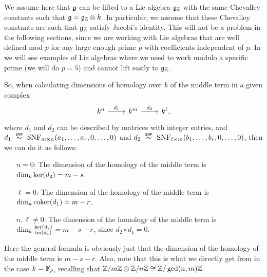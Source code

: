 \begin{remark}
  We assume here that $\mathfrak{g}$ can be lifted to a Lie algebra $\mathfrak{g}_{\mathbb{Z}}$ with the same Chevalley constants such that $\mathfrak{g} = \mathfrak{g}_{\mathbb{Z}} \otimes k$. In particular, we assume that these Chevalley constants are such that $\mathfrak{g}_{\mathbb{Z}}$ satisfy Jacobi's identity. This will not be a problem in the following sections, since we are working with Lie algebras that are well defined mod $p$ for any large enough prime $p$ with coefficients independent of $p$. In  we will see examples of Lie algebras where we need to work modulo a specific prime (we will do $p = 5$) and cannot lift easily to $\mathfrak{g}_{\mathbb{Z}}$.
\end{remark}

So, when calculating dimensions of homology over $k$ of the middle term in a given complex
\[
  \begin{tikzcd}
    k^{n} \ar[r,"d_{1}"] & k^{m} \ar[r,"d_{2}"] & k^{\ell},
  \end{tikzcd}
\]
where $d_{1}$ and $d_{2}$ can be described by matrices with integer entries, and $d_{1} \snfsim \SNF_{m \times n}(a_{1},\dotsc,a_{r},0,\dotsc,0)$ and $d_{2} \snfsim \SNF_{\ell \times m}(b_{1},\dotsc,b_{r},0,\dotsc,0)$, then we can do it as follows:
\begin{enumerate}[align=left]
  \item[$n=0$:] The dimension of the homology of the middle term is $\dim_{k} \operatorname{ker}(d_{2}) = m-s$.
  \item[$\ell=0$:] The dimension of the homology of the middle term is $\dim_{k} \operatorname{coker}(d_{1}) = m-r$.
  \item[$n,\ell \neq 0$:] The dimension of the homology of the middle term is $\dim_{k} \frac{\operatorname{ker}(d_{2})}{\operatorname{im}(d_{1})} = m-s-r$, since $d_{2} \circ d_{1} = 0$.
\end{enumerate}

\begin{remark}
  Here the general formula is obviously just that the dimension of the homology of the middle term is $m-s-r$. Also, note that this is what we directly get from  in the case $k = \mathbb{F}_{p}$, recalling that $\mathbb{Z}/m\mathbb{Z} \otimes \mathbb{Z}/n\mathbb{Z} \cong \mathbb{Z}/\gcd(n,m)\mathbb{Z}$.
\end{remark}

